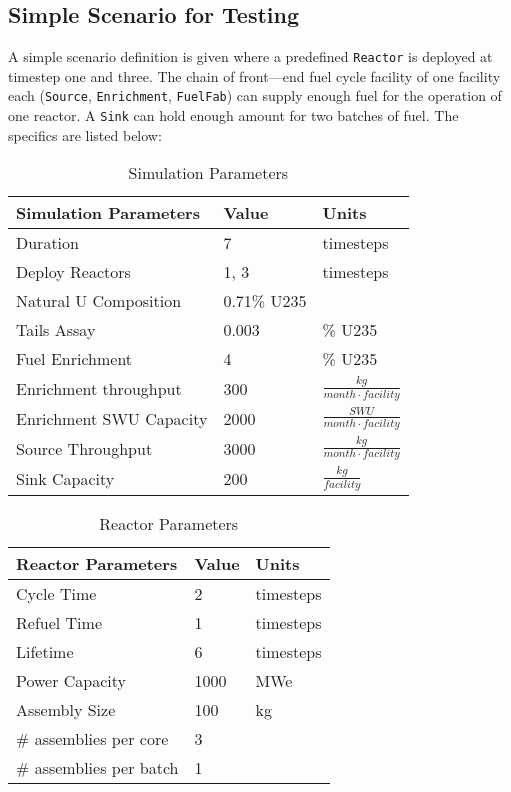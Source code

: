 \documentclass[12pt,letterpaper]{article}
\begin{document}
\subsection{Simple Scenario for Testing}

A simple scenario definition is given where a predefined \texttt{Reactor}
is deployed at timestep one and three. The chain of front---end
fuel cycle facility of one facility each 
(\texttt{Source}, \texttt{Enrichment}, \texttt{FuelFab}) can supply enough fuel
for the operation of one reactor. A \texttt{Sink} can hold enough
amount for two batches of fuel. The specifics are listed below:

\begin{table}[h]
     \centering
    \begin{tabularx}{\textwidth}{bbb}
       \hline
       Simulation Parameters & Value & Units \\
       \hline
       Duration & 7 & timesteps \\
       Deploy Reactors & 1, 3 & timesteps \\
       Natural U Composition & 0.71\% U235 & \\
       Tails Assay & 0.003 & \% U235 \\
       Fuel Enrichment & 4 & \% U235 \\
       Enrichment throughput & 300 & $\frac{kg}{month \cdot facility}$ \\
       Enrichment SWU Capacity & 2000 & $\frac{SWU}{month \cdot facility}$ \\
       Source Throughput & 3000 & $\frac{kg}{month \cdot facility}$\\
       Sink Capacity & 200 &  $\frac{kg}{facility}$ \\
       \hline
    \end{tabularx}
    \caption {Simulation Parameters}
    \label{tab:reactor}
\end{table}

\begin{table}[h]
    \centering
    \begin{tabularx}{\textwidth}{bbb}
       \hline
       Reactor Parameters & Value & Units \\
       \hline
       Cycle Time & 2 & timesteps \\
       Refuel Time & 1 & timesteps \\
       Lifetime & 6 & timesteps \\
       Power Capacity & 1000 & MWe \\
       Assembly Size & 100 & kg \\
       \# assemblies per core & 3 & \\
       \# assemblies per batch & 1 & \\
       \hline
    \end{tabularx}
    \caption {Reactor Parameters}
    \label{tab:reactor}
\end{table}
\end{document}

